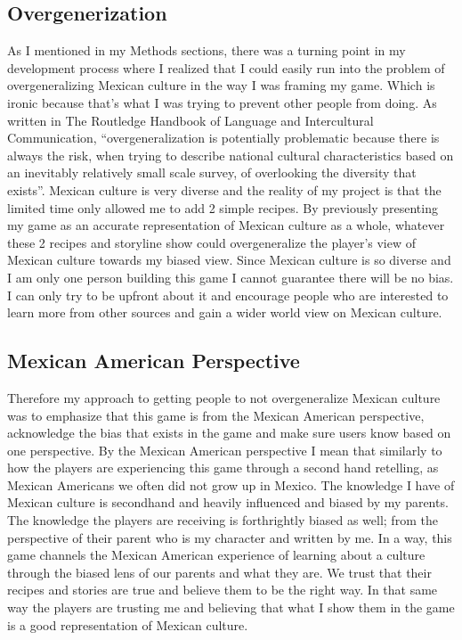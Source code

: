 \documentclass[10pt,twocolumn]{article}
\begin{document}
\subsection{Overgenerization}
As I mentioned in my Methods sections, there was a turning point in my development process where I realized that I could easily run into the problem of overgeneralizing Mexican culture in the way I was framing my game. Which is ironic because that’s what I was trying to prevent other people from doing. As written in The Routledge Handbook of Language and Intercultural Communication, “overgeneralization is potentially problematic because there is always the risk, when trying to describe national cultural characteristics based on an inevitably relatively small scale survey, of overlooking the diversity that exists”\cite{overGen2020}. Mexican culture is very diverse and the reality of my project is that the limited time only allowed me to add 2 simple recipes. By previously presenting my game as an accurate representation of Mexican culture as a whole, whatever these 2 recipes and storyline show could overgeneralize the player's view of Mexican culture towards my biased view. Since Mexican culture is so diverse and I am only one person building this game I cannot guarantee there will be no bias. I can only try to be upfront about it and encourage people who are interested to learn more from other sources and gain a wider world view on Mexican culture. 

\subsection{Mexican American Perspective}
Therefore my approach to getting people to not overgeneralize Mexican culture was to emphasize that this game is from the Mexican American perspective, acknowledge the bias that exists in the game and make sure users know based on one perspective. By the Mexican American perspective I mean that similarly to how the players are experiencing this game through a second hand retelling, as Mexican Americans we often did not grow up in Mexico. The knowledge I have of Mexican culture is secondhand and heavily influenced and biased by my parents. The knowledge the players are receiving is forthrightly biased as well; from the perspective of their parent who is my character and written by me. In a way, this game channels the Mexican American experience of learning about a culture through the biased lens of our parents and what they are. We trust that their recipes and stories are true and believe them to be the right way. In that same way the players are trusting me and believing that what I show them in the game is a good representation of Mexican culture. 



\printbibliography 
\end{document}
